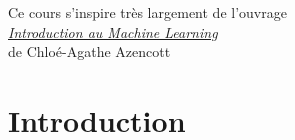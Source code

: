 \documentclass[10pt]{beamer}
\begin{document}

\begin{frame}
	\begin{center}
	\large\textcolor{MPTblue}{Ce cours s'inspire très largement de l'ouvrage\\[0.5em] \textit{\href{http://cazencott.info/dotclear/public/lectures/IntroML_Azencott.pdf}{Introduction au Machine Learning}} \\[0.5em] de Chloé-Agathe Azencott} 
	\end{center}
\end{frame}

\section{Introduction}

%
%		
%		
%		
%		
%		
\end{document}
